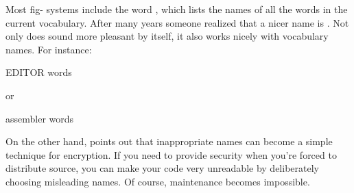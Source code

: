 Most fig-\Forth{} systems include the word , which lists
the names of all the words in the current vocabulary.  After many
years someone realized that a nicer name is .  Not only
does  sound more pleasant by itself, it also works nicely
with vocabulary names.  For instance:
\begin{Code}
EDITOR words
\end{Code}
or
\begin{Code}
assembler words
\end{Code}
On the other hand,  points out
that inappropriate names can become a simple technique for encryption.%
If you need to provide security when you're forced to distribute
source, you can make your code very unreadable by deliberately
choosing misleading names.  Of course, maintenance becomes impossible.

